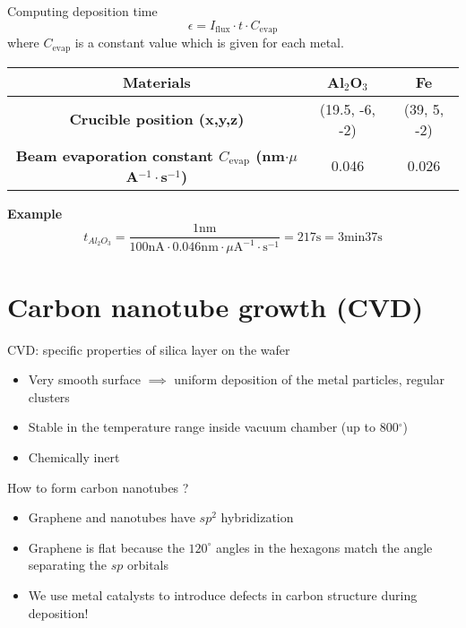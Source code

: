 \documentclass{beamer}
\begin{document}
\begin{frame}{Computing deposition time}
\[
    \epsilon = I_{\mathrm{flux}} \cdot t \cdot C_{\text{evap}}
\]
where $C_{\text{evap}}$ is a constant value which is given for each metal.

\begin{table}[H]
\centering
\scriptsize
\begin{tabular}{|c|c|c|}
    \hline
    \textbf{Materials} & Al$_2$O$_3$ & Fe \\
    \hline
    \textbf{Crucible position (x,y,z)}  & (19.5, -6, -2) & (39, 5, -2) \\
    \hline
    \textbf{Beam evaporation constant $C_{\mathrm{evap}}$ (nm$\cdot \mu$A$^{-1} \cdot$s$^{-1}$)}  & 0.046 & 0.026 \\
    \hline
\end{tabular}
\end{table}
\textbf{Example}
$$t_{Al_2O_3} = \frac{1 \mathrm{nm}}{100 \mathrm{nA} \cdot 0.046 \mathrm{nm} \cdot \mu\mathrm{A}^{-1} \cdot \mathrm{s}^{-1}} = 217 \mathrm{s} = 3 \mathrm{min} 37 \mathrm{s}$$
\end{frame}

\section{Carbon nanotube growth (CVD)}

\begin{frame}{CVD: specific properties of silica layer on the wafer}
\begin{itemize}
    \item Very smooth surface $\implies$ uniform deposition of the metal particles, regular clusters
    \item Stable in the temperature range inside vacuum chamber (up to 800$^{\circ}$)
    \item Chemically inert
\end{itemize}
\end{frame}

\begin{frame}{How to form carbon nanotubes ?}
\begin{itemize}
    \item Graphene and nanotubes have $sp^2$ hybridization
    \item Graphene is flat because the $120^{\circ}$ angles in the hexagons match the angle separating the $sp$ orbitals
    \item We use metal catalysts to introduce defects in carbon structure during deposition!
\end{itemize}
\begin{figure}[h]
    \centering
\end{figure}
\end{frame}
\end{document}
